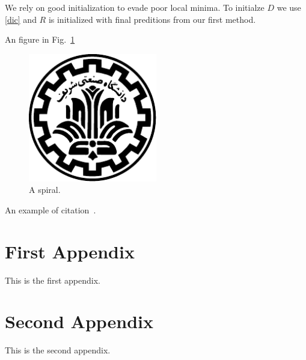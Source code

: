 \documentclass[wcp]{jmlr}
\begin{document}
We rely on good initialization to evade poor local minima.
To initialze $D$ we use
\eqref{dic} and $R$ is initialized with final preditions from our first method. 


An figure in Fig.~\ref{fig:spiral}
\begin{figure}[htp]
\begin{center}
\includegraphics[width=0.5\textwidth]{../images/logo.pdf}
\caption{A spiral.}\label{fig:spiral}
\end{center}
\end{figure}

An example of citation~\cite{DBLP:conf/acml/2009}.


%


\appendix

\section{First Appendix}\label{apd:first}

This is the first appendix.

\section{Second Appendix}\label{apd:second}

This is the second appendix.
\end{document}

